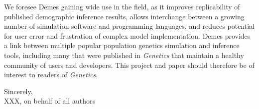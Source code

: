 \documentclass[11pt]{article}
\begin{document}
We foresee Demes gaining wide use in the field, as it improves replicability of
published demographic inference results, allows interchange between a growing
number of simulation software and programming languages, and reduces potential
for user error and frustration of complex model implementation. Demes provides
a link between multiple popular population genetics simulation and inference
tools, including many that were published in \emph{Genetics} that maintain a
healthy community of users and developers. This project and paper should
therefore be of interest to readers of \emph{Genetics}.

Sincerely,\\
XXX, on behalf of all authors
\end{document}
